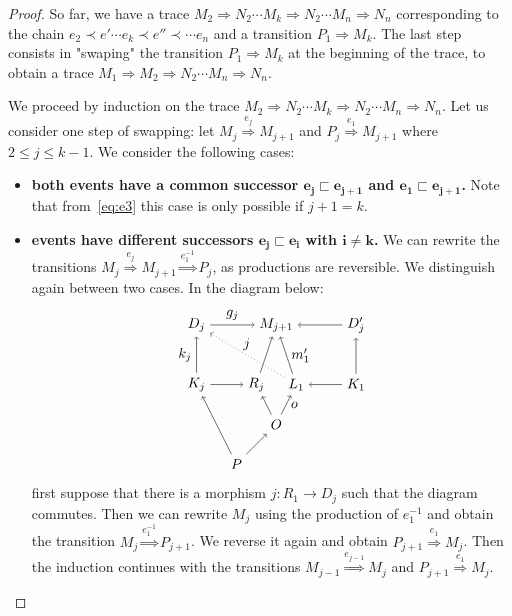 \begin{proof}
  So far, we have a trace $M_2\Rightarrow N_2\cdots M_k\Rightarrow N_2\cdots M_n\Rightarrow N_n$ corresponding to the chain $e_2\prec e'\cdots e_k\prec e''\prec\cdots e_n$ and a transition $P_1\Rightarrow M_k$. The last step consists in "swaping" the transition $P_1\Rightarrow M_k$ at the beginning of the trace, to obtain a trace $M_1\Rightarrow M_2\Rightarrow N_2\cdots M_n\Rightarrow N_n$.

  We proceed by induction on the trace $M_2\Rightarrow N_2\cdots M_k\Rightarrow N_2\cdots M_n\Rightarrow N_n$.
  Let us consider one step of swapping: let $M_j\overset{e_j}{\Rightarrow} M_{j+1}$ and $P_j\overset{e_1}{\Rightarrow}M_{j+1}$ where $2\leq j\leq k-1$. We consider the following cases:

  \begin{itemize}
  \item {\bf both events have a common successor $\mathbf{e_j\sqsubset e_{j+1}}$ and $\mathbf{e_1\sqsubset e_{j+1}}$.} Note that from~\autoref{eq:e3} this case is only possible if $j+1=k$.

  \item {\bf events have different successors $\mathbf{e_j\sqsubset e_i}$ with $\mathbf{i\neq k}$.}
    We can rewrite the transitions $M_j\overset{e_j}{\Rightarrow} M_{j+1}\overset{e_1^{-1}}{\Rightarrow} P_j$, as productions are reversible. We distinguish again between two cases. In the diagram below:
    \[
    \begin{tikzpicture} %
    \node (r1) at (1.5,0) {\(R_j\)};
    \node (m1) at (2,1.5) {\(M_{j+1}\)};
    \node (l2) at (2.5,0) {\(L_1\)};
    \node (d1) at (0,1.5) {\(D_j\)};
    \node (k1) at (0,0) {\(K_j\)};
    \node (d2) at (4,1.5) {\(D_j'\)};
    \node (k2) at (4,0) {\(K_1\)};
    \node (o) at (2,-1) {\(O\)};
    \node (p) at (1,-2) {\(P\)};
    \draw [->] (k1) -- (r1);
    \draw [->] (k2) -- (l2);
    \draw [->] (k1) -- node [left,midway] {\(k_j\)} (d1);
    \draw [->] (k2) -- (d2);
    \draw [->] (d1) -- node [above,midway] {\(g_j\)} (m1);
    \draw [->] (d2) -- (m1);
    \draw [->] (l2) -- node [right,midway] {\(m_1'\)} (m1);
    \draw [->] (r1) -- (m1);
    \draw [dotted,->] (l2) -- node [above,midway] {\(j\)} (d1);
    \draw [->] (p) -- (k1);
    \draw [->] (p) -- (o);
    \draw [->] (o) -- (r1);
    \draw [->] (o) -- node [right,midway] {$o$} (l2);
    \end{tikzpicture}
    \]
    first suppose that there is a morphism $j:R_1\to D_j$ such that the diagram commutes. Then we can rewrite $M_j$ using the production of $e_1^{-1}$ and obtain the transition $M_j\overset{e_1^{-1}}{\Rightarrow}P_{j+1}$. We reverse it again and obtain $P_{j+1}\overset{e_1}{\Rightarrow} M_j$. Then the induction continues with the transitions $M_{j-1}\overset{e_{j-1}}{\Rightarrow} M_{j}$ and $P_{j+1}\overset{e_1}{\Rightarrow} M_j$.


\end{itemize}
\end{proof}
